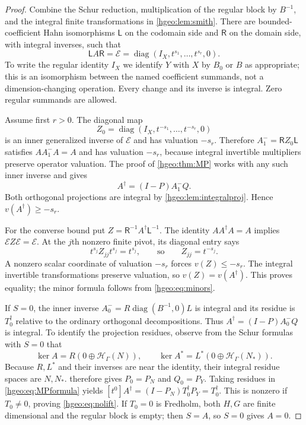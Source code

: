 \documentclass[11pt,letterpaper]{article}
\numberwithin{equation}{section}
\theoremstyle{definition}
\theoremstyle{remark}
\newcommand{\HH}[1]{\mathscr H_\Gamma(#1)}
\newcommand{\diag}{\operatorname{diag}}
\begin{document}
\begin{proof}
Combine the Schur reduction, multiplication of the regular block
by $B^{-1}$, and the integral finite transformations in
\cref{hgeo:lem:smith}. There are bounded-coefficient Hahn
isomorphisms $\mathsf L$ on the codomain side and $\mathsf R$ on the domain
side, with integral inverses, such that
\begin{equation}\label{hgeo:eq:fullnormal}
 \mathsf LA\mathsf R=\mathcal E
  =\diag(I_X,t^{s_1},\ldots,t^{s_r},0).
\end{equation}
To write the regular identity $I_X$ we identify $Y$ with $X$ by
$B_0$ or $B$ as appropriate; this is an isomorphism between the
named coefficient summands, not a dimension-changing operation.
Every change and its inverse is integral. Zero regular summands
are allowed.

Assume first $r>0$. The diagonal map
\[
 Z_0=\diag(I_X,t^{-s_1},\ldots,t^{-s_r},0)
\]
is an inner generalized inverse of $\mathcal E$ and has valuation
$-s_r$. Therefore
$A^-_1=\mathsf RZ_0\mathsf L$ satisfies $AA^-_1A=A$ and has valuation $-s_r$,
because integral invertible multipliers preserve operator valuation.
The proof of \cref{hgeo:thm:MP} works with any such inner inverse and gives
\[
 A^\dagger=(I-P)A^-_1Q.
\]
Both orthogonal projections are integral by
\cref{hgeo:lem:integralproj}. Hence
$v(A^\dagger)\ge-s_r$.

For the converse bound put
$Z=\mathsf R^{-1}A^\dagger\mathsf L^{-1}$. The identity
$AA^\dagger A=A$ implies $\mathcal E Z\mathcal E=\mathcal E$.
At the $j$th nonzero finite pivot, its diagonal entry says
\[
 t^{s_j}Z_{jj}t^{s_j}=t^{s_j},
 \qquad\text{so}\qquad Z_{jj}=t^{-s_j}.
\]
A nonzero scalar coordinate of valuation $-s_r$ forces
$v(Z)\le-s_r$. The integral invertible transformations preserve
valuation, so $v(Z)=v(A^\dagger)$. This proves equality; the
minor formula follows from \eqref{hgeo:eq:minors}.

If $S=0$, the inner inverse
$A^-_0=R\diag(B^{-1},0)L$ is integral and its residue
is $T_0^\dagger$ relative to the ordinary orthogonal decompositions.
Thus $A^\dagger=(I-P)A^-_0Q$ is integral. To identify the projection
residues, observe from the Schur formulas with $S=0$ that
\[
 \ker A=R(0\oplus\HH{N}),\qquad
 \ker A^*=L^*(0\oplus\HH{N_*}).
\]
Because $R,L^*$ and their inverses are near the identity, their
integral residue spaces are $N,N_*$. 
therefore gives $P_0=P_N$ and $Q_0=P_Y$. Taking residues in
\eqref{hgeo:eq:MPformula} yields
$[t^0]A^\dagger=(I-P_N)T_0^\dagger P_Y=T_0^\dagger$.
This is nonzero if $T_0\ne0$, proving \eqref{hgeo:eq:nolift}.
If $T_0=0$ is Fredholm, both $H,G$ are finite dimensional and the
regular block is empty; then $S=A$, so $S=0$ gives $A=0$.
\end{proof}
\end{document}
